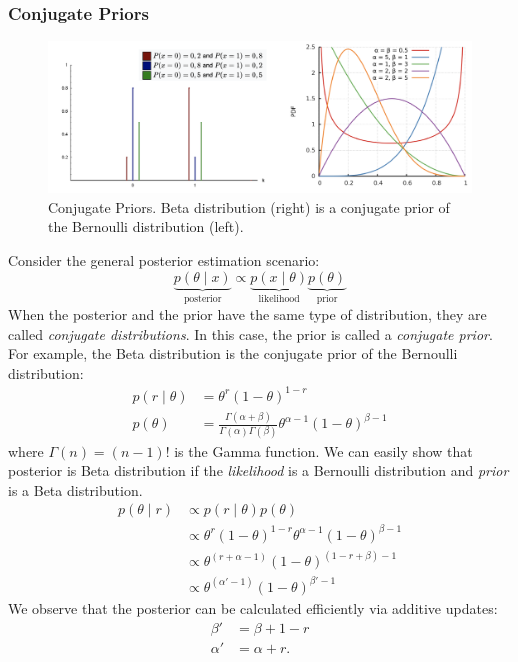 \documentclass[11pt]{article}
\begin{document}
\subsubsection{Conjugate Priors}
\begin{figure}[H]
    \centering
    \includegraphics[width=\textwidth]{images/beta-bernoulli.png}
    \caption{Conjugate Priors. Beta distribution (right) is a conjugate prior of the Bernoulli
    distribution (left).}
    \label{fig:my_label}
\end{figure}
Consider the general posterior estimation scenario:
\[
\underbrace{p(\theta \mid x)}_{\text{posterior}} \propto \underbrace{p(x \mid \theta)}_{\text{likelihood}} \underbrace{p(\theta)}_{\text{prior}}
\]
When the posterior and the prior have the same type of distribution, they are called
\textit{conjugate distributions}. In this case, the prior is called a \textit{conjugate prior}.
For example, the Beta distribution is the conjugate prior of the Bernoulli distribution:
\begin{align*}
p(r \mid \theta) &= \theta^r (1-\theta)^{1-r} \tag{Bernoulli Distribution}\\
p(\theta) &= \frac{\Gamma(\alpha + \beta)}{\Gamma(\alpha) \Gamma(\beta)} \theta^{\alpha - 1} (1 - \theta)^{\beta - 1} \tag{Beta Distribution}
\end{align*}
where $\Gamma(n) = (n-1)!$ is the Gamma function. We can easily show that posterior is Beta
distribution if the \textit{likelihood} is a Bernoulli distribution and \textit{prior} is
a Beta distribution.
\begin{align*}
    p(\theta \mid r) &\propto p(r \mid \theta) p(\theta)\\
    &\propto \theta^r(1-\theta)^{1-r} \theta^{\alpha - 1} (1-\theta)^{\beta - 1}\\
    &\propto \theta^{(r + \alpha - 1)}(1-\theta)^{(1-r+\beta) - 1} \\
    &\propto \theta^{(\alpha' - 1)}(1-\theta)^{\beta' - 1}
\end{align*}
We observe that the posterior can be calculated efficiently via additive updates:
\begin{align*}
    \beta' &= \beta + 1 - r\\
    \alpha' &= \alpha + r.
\end{align*}
\end{document}
